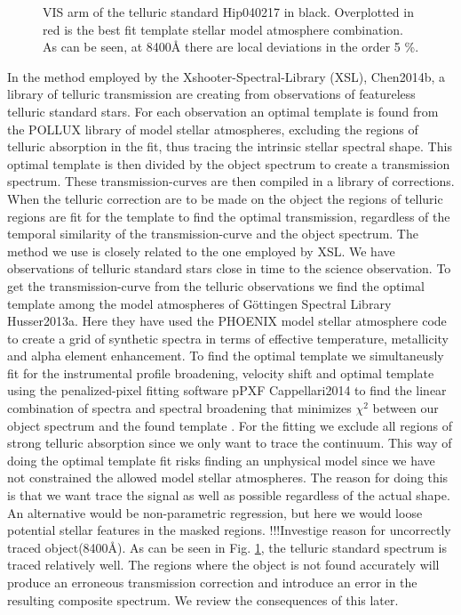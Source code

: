\documentclass[iop]{emulateapj}
\begin{document}
\begin{figure}
\caption{VIS arm of the telluric standard Hip040217 in black. Overplotted in red is the best fit template stellar model atmosphere combination. As can be seen, at 8400\r{A}  there are local deviations in the order 5 \%.\label{tellqc}}
\end{figure}

In the method employed by the Xshooter-Spectral-Library (XSL), Chen2014b, a library of telluric transmission are creating from observations of featureless telluric standard stars. For each observation an optimal template is found from the POLLUX library of model stellar atmospheres, excluding the regions of telluric absorption in the fit, thus tracing the intrinsic stellar spectral shape. This optimal template is then divided by the object spectrum to create a transmission spectrum. These transmission-curves are then compiled in a library of corrections. When the telluric correction are to be made on the object the regions of telluric regions are fit for the template to find the optimal transmission, regardless of the temporal similarity of the transmission-curve and the object spectrum. The method we use is closely related to the one employed by XSL. We have observations of telluric standard stars close in time to the science observation. To get the transmission-curve from the telluric observations we find the optimal template among the model atmospheres of Göttingen Spectral Library Husser2013a. Here they have used the PHOENIX model stellar atmosphere code to create a grid of synthetic spectra in terms of effective temperature, metallicity and alpha element enhancement. To find the optimal template we simultaneusly fit for the instrumental profile broadening, velocity shift and optimal template using the penalized-pixel fitting software pPXF Cappellari2014 to find the linear combination of spectra and spectral broadening that minimizes $\chi ^2$ between our object spectrum and the found template . For the fitting we exclude all regions of strong telluric absorption since we only want to trace the continuum. This way of doing the optimal template fit risks finding an unphysical model since we have not constrained the allowed model stellar atmospheres. The reason for doing this is that we want trace the signal as well as possible regardless of the actual shape. An alternative would be non-parametric regression, but here we would loose potential stellar features in the masked regions. !!!Investige reason for uncorrectly traced object(8400\r{A}). As can be seen in Fig. \ref{tellqc}, the telluric standard spectrum is traced relatively well. The regions where the object is not found accurately will produce an erroneous transmission correction and introduce an error in the resulting composite spectrum. We review the consequences of this later. 
\end{document}
